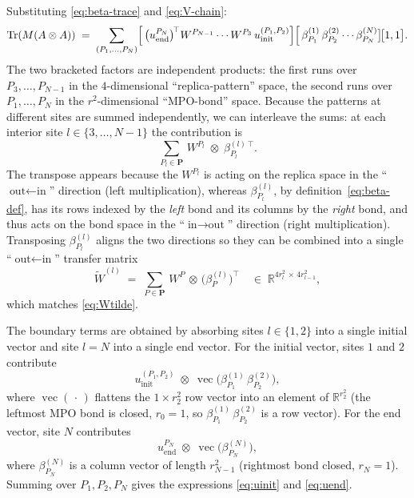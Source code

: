 \documentclass[11pt]{article}
\DeclareMathOperator{\Tr}{Tr}
\DeclareMathOperator{\vecop}{vec}
\newcommand{\IR}{\mathbb{R}}
\newcommand{\bP}{\boldsymbol{P}}
\newcommand{\Wtilde}{\widetilde{W}}
\begin{document}
Substituting \eqref{eq:beta-trace} and \eqref{eq:V-chain}:
\begin{equation}\label{eq:two-chains}
\Tr(M(A\otimes A))
\;=\;
\sum_{(P_1,\dots,P_N)}
\Bigl[\,\bigl(u_{\mathrm{end}}^{P_N}\bigr)^{\!\top}
W^{P_{N-1}}\cdots W^{P_3}\,u_{\mathrm{init}}^{(P_1,P_2)}\Bigr]
\Bigl[\,\beta_{P_1}^{(1)}\,\beta_{P_2}^{(2)}\cdots\beta_{P_N}^{(N)}
\bigr]\!\bigl[1,1\bigr].
\end{equation}
The two bracketed factors are independent products: the first runs over
$P_3,\dots,P_{N-1}$ in the $4$-dimensional ``replica-pattern'' space, the
second runs over $P_1,\dots,P_N$ in the $r^2$-dimensional ``MPO-bond''
space. Because the patterns at different sites are summed independently,
we can interleave the sums: at each interior site $l\in\{3,\dots,N-1\}$ the
contribution is
\[
\sum_{P_l\in\bP}\, W^{P_l}\;\otimes\;\beta_{P_l}^{(l)\,\top}.
\]
The transpose appears because the $W^{P_l}$ is acting on the replica space
in the ``$\text{out}\leftarrow\text{in}$'' direction (left multiplication),
whereas $\beta_{P_l}^{(l)}$, by definition~\eqref{eq:beta-def}, has its rows
indexed by the \emph{left} bond and its columns by the \emph{right} bond, and
thus acts on the bond space in the ``$\text{in}\rightarrow\text{out}$''
direction (right multiplication). Transposing $\beta_{P_l}^{(l)}$ aligns the
two directions so they can be combined into a single
``$\text{out}\leftarrow\text{in}$'' transfer matrix
\begin{equation}\label{eq:Wtilde-derived}
\Wtilde^{(l)} \;=\; \sum_{P\in\bP}\, W^P\,\otimes\,\bigl(\beta_P^{(l)}\bigr)^{\!\top}
\quad\in\;\IR^{4 r_l^2 \,\times\, 4 r_{l-1}^2},
\end{equation}
which matches \eqref{eq:Wtilde}.

The boundary terms are obtained by absorbing sites $l\in\{1,2\}$ into a
single initial vector and site $l=N$ into a single end vector. For the
initial vector, sites $1$ and $2$ contribute
\[
u_{\mathrm{init}}^{(P_1,P_2)}\;\otimes\;\vecop\!\bigl(\beta_{P_1}^{(1)}\,\beta_{P_2}^{(2)}\bigr),
\]
where $\vecop(\,\cdot\,)$ flattens the $1\times r_2^2$ row vector into an
element of $\IR^{r_2^2}$ (the leftmost MPO bond is closed, $r_0=1$, so
$\beta_{P_1}^{(1)}\,\beta_{P_2}^{(2)}$ is a row vector). For the end
vector, site $N$ contributes
\[
u_{\mathrm{end}}^{P_N}\;\otimes\;\vecop\!\bigl(\beta_{P_N}^{(N)}\bigr),
\]
where $\beta_{P_N}^{(N)}$ is a column vector of length $r_{N-1}^2$
(rightmost bond closed, $r_N=1$). Summing over $P_1,P_2,P_N$ gives the
expressions \eqref{eq:uinit} and \eqref{eq:uend}.
\end{document}
